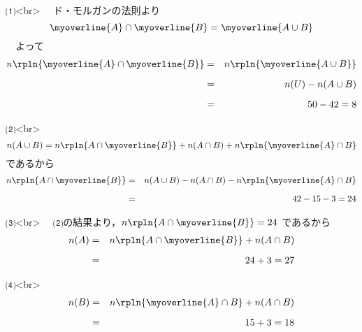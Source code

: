 ⑴<br>
　ド・モルガンの法則より
$$
\myoverline{A} \cap \myoverline{B} = \myoverline{A \cup B}
$$
　よって
\begin{eqnarray*}
  n\rpln{\myoverline{A} \cap \myoverline{B}} 
    &=& n\rpln{\myoverline{A \cup B}} \\[0.6em]
    &=& n(U) - n(A \cup B) \\[0.6em]
    &=& 50 - 42 = 8
\end{eqnarray*}

⑵<br>
$$
n(A \cup B) = n\rpln{A \cap \myoverline{B}}
+ n(A \cap B)
+ n\rpln{\myoverline{A} \cap B}
$$
であるから
\begin{eqnarray*}
  n\rpln{A \cap \myoverline{B}} &=& n(A \cup B) 
                                    - n(A \cap B)
                                    - n\rpln{\myoverline{A} \cap B} \\[0.6em]
                                &=& 42 - 15 - 3 = 24
\end{eqnarray*}

⑶<br>
　⑵の結果より，$n\rpln{A \cap \myoverline{B}}=24$ であるから
\begin{eqnarray*}
  n(A) &=& n\rpln{A \cap \myoverline{B}} + n(A \cap B) \\[0.6em]
       &=& 24 + 3 = 27
\end{eqnarray*}

⑷<br>
\begin{eqnarray*}
  n(B) &=& n\rpln{\myoverline{A} \cap B} + n(A \cap B) \\[0.6em]
       &=& 15 + 3 = 18
\end{eqnarray*}
